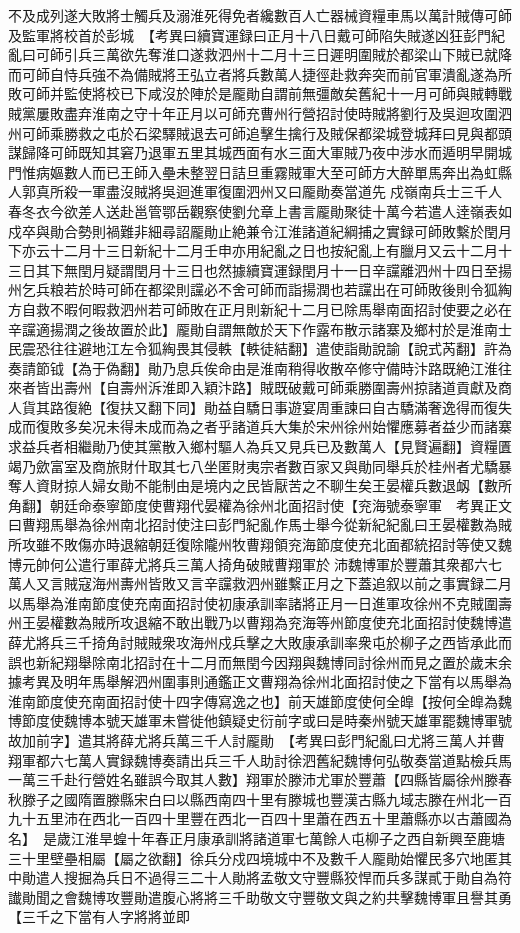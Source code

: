 不及成列遂大敗將士觸兵及溺淮死得免者纔數百人亡器械資糧車馬以萬計賊傳可師及監軍將校首於彭城　【考異曰續寶運録曰正月十八日戴可師陷失賊遂凶狂彭門紀亂曰可師引兵三萬欲先奪淮口遂救泗州十二月十三日遲明圍賊於都梁山下賊已就降而可師自恃兵強不為備賊將王弘立者將兵數萬人捷徑赴救奔突而前官軍潰亂遂為所敗可師并監使將校已下咸沒於陣於是龎勛自謂前無彊敵矣舊紀十一月可師與賊轉戰賊黨屢敗盡弃淮南之守十年正月以可師充曹州行營招討使時賊將劉行及吳迴攻圍泗州可師乘勝救之屯於石梁驛賊退去可師追擊生擒行及賊保都梁城登城拜曰見與都頭謀歸降可師既知其窘乃退軍五里其城西面有水三面大軍賊乃夜中涉水而遁明早開城門惟病嫗數人而已王師入壘未整翌日詰旦重霧賊軍大至可師方大醉單馬奔出為虹縣人郭真所殺一軍盡沒賊將吳迴進軍復圍泗州又曰龎勛奏當道先戍嶺南兵士三千人春冬衣今欲差人送赴邕管鄂岳觀察使劉允章上書言龎勛聚徒十萬今若遣人逹嶺表如戍卒與勛合勢則禍難非細尋詔龎勛止絶兼令江淮諸道紀綱捕之實録可師敗繫於閏月下亦云十二月十三日新紀十二月壬申亦用紀亂之日也按紀亂上有臘月又云十二月十三日其下無閏月疑謂閏月十三日也然據續寶運録閏月十一日辛讜離泗州十四日至揚州乞兵粮若於時可師在都梁則讜必不舍可師而詣揚潤也若讜出在可師敗後則令狐綯方自救不暇何暇救泗州若可師敗在正月則新紀十二月已除馬舉南面招討使要之必在辛讜適揚潤之後故置於此】龎勛自謂無敵於天下作露布散示諸寨及鄉村於是淮南士民震恐往往避地江左令狐綯畏其侵軼【軼徒結翻】遣使詣勛說諭【說式芮翻】許為奏請節钺【為于偽翻】勛乃息兵俟命由是淮南稍得收散卒修守備時汴路既絶江淮往來者皆出壽州【自壽州泝淮即入穎汴路】賊既破戴可師乘勝圍壽州掠諸道貢獻及商人貨其路復絶【復扶又翻下同】勛益自驕日事遊宴周重諫曰自古驕滿奢逸得而復失成而復敗多矣况未得未成而為之者乎諸道兵大集於宋州徐州始懼應募者益少而諸寨求益兵者相繼勛乃使其黨散入鄉村驅人為兵又見兵已及數萬人【見賢遍翻】資糧匱竭乃歛富室及商旅財什取其七八坐匿財夷宗者數百家又與勛同舉兵於桂州者尤驕暴奪人資財掠人婦女勛不能制由是境内之民皆厭苦之不聊生矣王晏權兵數退衂【數所角翻】朝廷命泰寧節度使曹翔代晏權為徐州北面招討使【兖海號泰寧軍　考異正文曰曹翔馬舉為徐州南北招討使注曰彭門紀亂作馬士舉今從新紀紀亂曰王晏權數為賊所攻雖不敗傷亦時退縮朝廷復除隴州牧曹翔領兖海節度使充北面都統招討等使又魏博元帥何公遣行軍薛尤將兵三萬人掎角破賊曹翔軍於沛魏博軍於豐蕭其衆都六七萬人又言賊寇海州夀州皆敗又言辛讜救泗州雖繫正月之下蓋追叙以前之事實録二月以馬舉為淮南節度使充南面招討使初康承訓率諸將正月一日進軍攻徐州不克賊圍壽州王晏權數為賊所攻退縮不敢出戰乃以曹翔為兖海等州節度使充北面招討使魏博遣薛尤將兵三千掎角討賊賊衆攻海州戍兵擊之大敗康承訓率衆屯於柳子之西皆承此而誤也新紀翔舉除南北招討在十二月而無閏今因翔與魏博同討徐州而見之置於歲末余據考異及明年馬舉解泗州圍事則通鑑正文曹翔為徐州北面招討使之下當有以馬舉為淮南節度使充南面招討使十四字傳寫逸之也】前天雄節度使何全皥【按何全皥為魏博節度使魏博本號天雄軍未嘗徙他鎮疑史衍前字或曰是時秦州號天雄軍罷魏博軍號故加前字】遣其將薛尤將兵萬三千人討龎勛　【考異曰彭門紀亂曰尤將三萬人并曹翔軍都六七萬人實録魏博奏請出兵三千人助討徐泗舊紀魏博何弘敬奏當道點檢兵馬一萬三千赴行營姓名雖誤今取其人數】翔軍於滕沛尤軍於豐蕭【四縣皆屬徐州滕春秋滕子之國隋置滕縣宋白曰以縣西南四十里有滕城也豐漢古縣九域志滕在州北一百九十五里沛在西北一百四十里豐在西北一百四十里蕭在西五十里蕭縣亦以古蕭國為名】　是歲江淮旱蝗十年春正月康承訓將諸道軍七萬餘人屯柳子之西自新興至鹿塘三十里壁壘相屬【屬之欲翻】徐兵分戍四境城中不及數千人龎勛始懼民多穴地匿其中勛遣人搜掘為兵日不過得三二十人勛將孟敬文守豐縣狡悍而兵多謀貳于勛自為符䜟勛聞之會魏博攻豐勛遣腹心將將三千助敬文守豐敬文與之約共擊魏博軍且譽其勇【三千之下當有人字將將並即